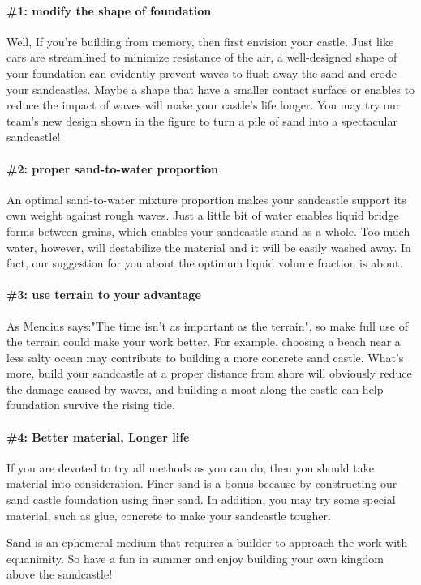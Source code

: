 \documentclass[12pt]{article}
\begin{document}
\paragraph{\#1: modify the shape of foundation}
Well, If you're building from memory, then first envision your castle. Just like cars are streamlined to minimize resistance of the air, a well-designed shape of your foundation can evidently prevent waves to flush away the sand and erode your sandcastles. Maybe a shape that have a smaller contact surface or enables to reduce the impact of waves will make your castle's life longer. You may try our team's new design shown in the figure to turn a pile of sand into a spectacular sandcastle!
\paragraph{\#2: proper sand-to-water proportion}
An optimal sand-to-water mixture proportion makes your sandcastle support its own weight against rough waves. Just a little bit of water enables liquid bridge forms between grains, which enables your sandcastle stand as a whole. Too much water, however, will destabilize the material and it will be easily washed away. In fact, our suggestion for you about the optimum liquid volume fraction is about.

\paragraph{\#3: use terrain to your advantage}
As Mencius says:"The time isn't as important as the terrain", so make full use of the terrain could make your work better. For example, choosing a beach near a less salty ocean may contribute to building a more concrete sand castle. What's more, build your sandcastle at a proper distance from shore will obviously reduce the damage caused by waves, and building a moat along the castle can help foundation survive the rising tide.
\paragraph{\#4: Better material, Longer life}
If you are devoted to try all methods as you can do, then you should take material into consideration. Finer sand is a bonus because by constructing our sand castle foundation using finer sand. In addition, you may try some special material, such as glue, concrete to make your sandcastle tougher.
\par
Sand is an ephemeral medium that requires a builder to approach the work with equanimity. So have a fun in summer and enjoy building your own kingdom above the sandcastle!
\newpage
\end{document}
